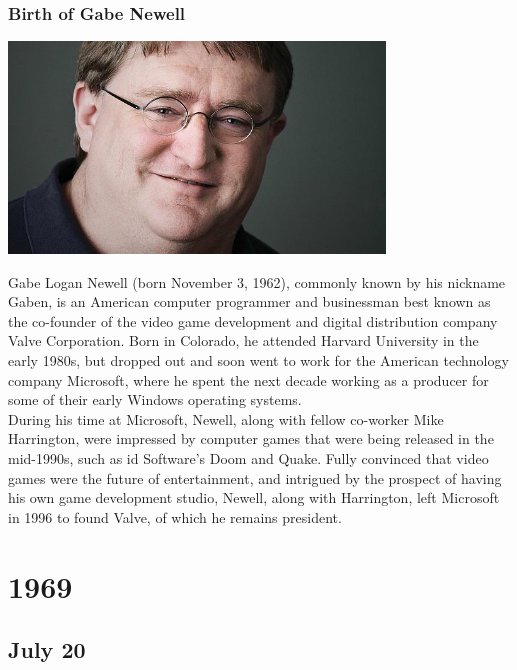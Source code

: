 \documentclass[11pt]{report}
\begin{document}
\subsection{Birth of Gabe Newell}
\vspace{2mm}\begin{center}\includegraphics[width=10cm]{./img/gaben.jpg}\end{center}
Gabe Logan Newell (born November 3, 1962), commonly known by his nickname Gaben, is an American computer programmer and businessman best known as the co-founder of the video game development and digital distribution company Valve Corporation. Born in Colorado, he attended Harvard University in the early 1980s, but dropped out and soon went to work for the American technology company Microsoft, where he spent the next decade working as a producer for some of their early Windows operating systems. \\

During his time at Microsoft, Newell, along with fellow co-worker Mike Harrington, were impressed by computer games that were being released in the mid-1990s, such as id Software's Doom and Quake. Fully convinced that video games were the future of entertainment, and intrigued by the prospect of having his own game development studio, Newell, along with Harrington, left Microsoft in 1996 to found Valve, of which he remains president.

\chapter{1969}
\section{July 20}
\end{document}
